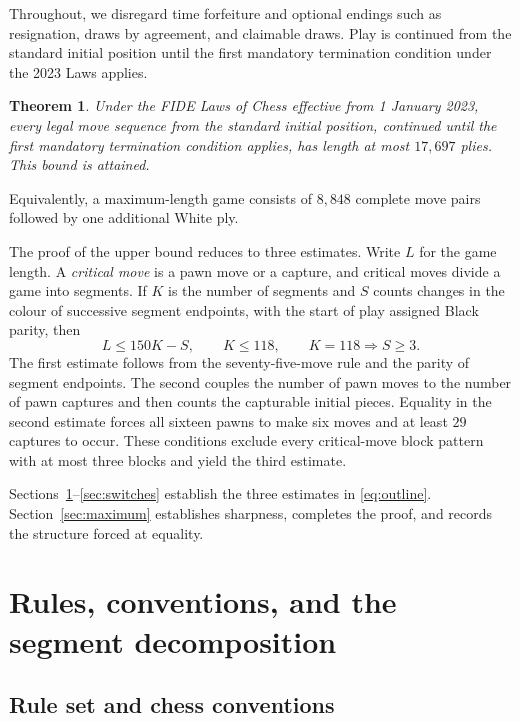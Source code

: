 \documentclass[11pt]{article}
\newtheorem{theorem}{Theorem}[section]
\theoremstyle{definition}
\begin{document}
Throughout, we disregard time forfeiture and optional endings such as
resignation, draws by agreement, and claimable draws. Play is continued from the
standard initial position until the first mandatory termination condition under
the 2023 Laws applies.

\begin{theorem}\label{thm:main}
Under the FIDE Laws of Chess effective from 1 January 2023, every legal move
sequence from the standard initial position, continued until the first
mandatory termination condition applies, has length at most $17{,}697$ plies.
This bound is attained.
\end{theorem}

Equivalently, a maximum-length game consists of $8{,}848$ complete move pairs
followed by one additional White ply.

The proof of the upper bound reduces to three estimates. Write $L$ for the
game length. A \emph{critical move} is a pawn move or a capture, and critical
moves divide a game into segments. If $K$ is the number of segments and $S$
counts changes in the colour of successive segment endpoints, with the start
of play assigned
Black parity, then
\begin{equation}\label{eq:outline}
  L\le150K-S,\qquad
  K\le118,\qquad
  K=118\Longrightarrow S\ge3.
\end{equation}
The first estimate follows from the seventy-five-move rule and the parity of
segment endpoints. The second couples the number of pawn moves to the number
of pawn captures and then counts the capturable initial pieces. Equality in the
second estimate forces all sixteen pawns to make six moves and at least $29$
captures to occur. These conditions exclude every critical-move block pattern
with at most three blocks and yield the third estimate.

Sections~\ref{sec:setting}--\ref{sec:switches} establish the three estimates in
\eqref{eq:outline}. Section~\ref{sec:maximum} establishes sharpness, completes
the proof, and records the structure forced at equality.

\section{Rules, conventions, and the segment decomposition}
\label{sec:setting}

\subsection{Rule set and chess conventions}
\end{document}

